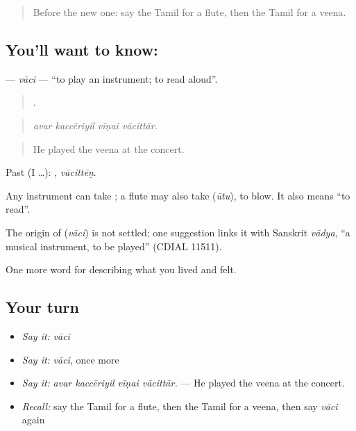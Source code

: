 \label{lesson:TA-C539-vaci}



\begin{quote}
Before the new one: say the Tamil for a flute, then the Tamil for a veena.
\end{quote}

\subsection*{You'll want to know: }
\textbf{} — \emph{vāci} — \textquotedblleft{}to play an instrument; to read aloud\textquotedblright{}.

\begin{quote}
   .
\end{quote}

\begin{quote}
\emph{avar kaccēriyil vīṇai vācittār.}
\end{quote}

\begin{quote}
He played the veena at the concert.
\end{quote}

Past (I …): , \emph{vācittēṉ}.

Any instrument can take ; a flute may also take  (\emph{ūtu}), to blow. It also means \textquotedblleft{}to read\textquotedblright{}.

\begin{cousinweb}
The origin of \textbf{} (\emph{vāci}) is not settled; one suggestion links it with Sanskrit \emph{vādya}, \textquotedblleft{}a musical instrument, to be played\textquotedblright{} (CDIAL 11511).
\end{cousinweb}

\begin{grammarlens}[title={What you've built}]
One more word for describing what you lived and felt.
\end{grammarlens}

\subsection*{Your turn}
\begin{itemize}
\raggedright
  \item \emph{Say it:} \emph{vāci}
  \item \emph{Say it:} \emph{vāci}, once more
  \item \emph{Say it:} \emph{avar kaccēriyil vīṇai vācittār.} — He played the veena at the concert.
  \item \emph{Recall:} say the Tamil for a flute, then the Tamil for a veena, then say \emph{vāci} again
\end{itemize}

